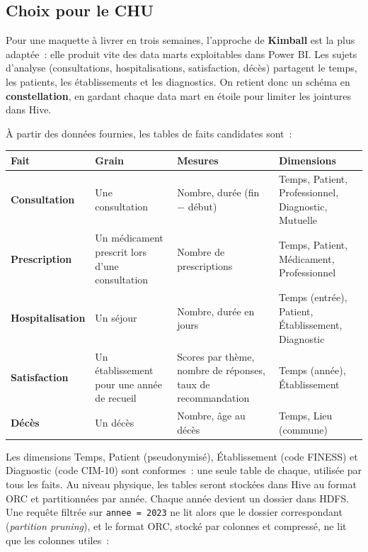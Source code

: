 \subsection{Choix pour le CHU}

\noindent Pour une maquette à livrer en trois semaines, l'approche de \textbf{Kimball} est la plus adaptée~: elle produit vite des data marts exploitables dans Power BI. Les sujets d'analyse (consultations, hospitalisations, satisfaction, décès) partagent le temps, les patients, les établissements et les diagnostics. On retient donc un schéma en \textbf{constellation}, en gardant chaque data mart en étoile pour limiter les jointures dans Hive.

\noindent À partir des données fournies, les tables de faits candidates sont~:

\begin{center}
\begin{tabularx}{\textwidth}{>{\bfseries}l >{\raggedright\arraybackslash}X >{\raggedright\arraybackslash}X >{\raggedright\arraybackslash}X}
\toprule
Fait & Grain & Mesures & Dimensions \\
\midrule
Consultation & Une consultation & Nombre, durée (fin $-$ début) & Temps, Patient, Professionnel, Diagnostic, Mutuelle \\
Prescription & Un médicament prescrit lors d'une consultation & Nombre de prescriptions & Temps, Patient, Médicament, Professionnel \\
Hospitalisation & Un séjour & Nombre, durée en jours & Temps (entrée), Patient, Établissement, Diagnostic \\
Satisfaction & Un établissement pour une année de recueil & Scores par thème, nombre de réponses, taux de recommandation & Temps (année), Établissement \\
Décès & Un décès & Nombre, âge au décès & Temps, Lieu (commune) \\
\bottomrule
\end{tabularx}
\end{center}

\noindent Les dimensions Temps, Patient (pseudonymisé), Établissement (code FINESS) et Diagnostic (code CIM-10) sont conformes~: une seule table de chaque, utilisée par tous les faits. Au niveau physique, les tables seront stockées dans Hive au format ORC et partitionnées par année. Chaque année devient un dossier dans HDFS. Une requête filtrée sur \texttt{annee = 2023} ne lit alors que le dossier correspondant (\textit{partition pruning}), et le format ORC, stocké par colonnes et compressé, ne lit que les colonnes utiles~:

